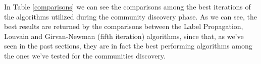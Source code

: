     In Table \ref{comparisons} we can see the comparisons among the best iterations of the algorithms utilized
    during the community discovery phase. As we can see, the best results are returned by the comparisons between
    the Label Propagation, Louvain and Girvan-Newman (fifth iteration) algorithms, since that, as we've seen in
    the past sections, they are in fact the best performing algorithms among the ones we've tested for the
    communities discovery.

